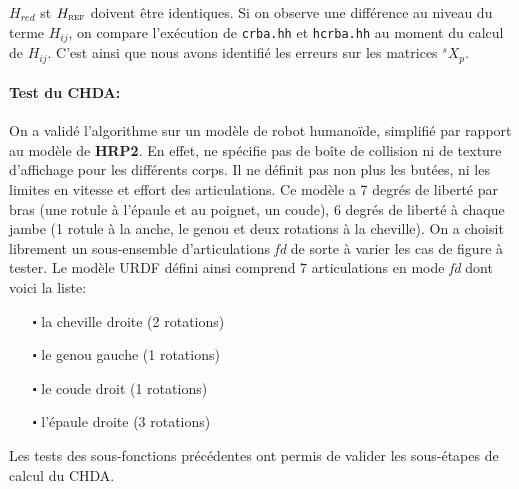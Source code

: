 \documentclass{report}
\begin{document}
$H_{red}$ st $H_{\textsc{ref}}$ doivent être identiques. Si on observe une différence au niveau du terme $H_{ij}$, on compare l'exécution de \verb;crba.hh; et \verb;hcrba.hh; au moment du calcul de $H_{ij}$. C'est ainsi que nous avons identifié les erreurs sur les matrices $^sX_p$.

\paragraph{Test du CHDA:}

On a validé l'algorithme sur un modèle de robot humanoïde, simplifié par rapport au modèle de \textbf{HRP2}. En effet, ne spécifie pas de boîte de collision ni de texture d'affichage pour les différents corps. Il ne définit pas non plus les butées, ni les limites en vitesse et effort des articulations. Ce modèle a 7 degrés de liberté par bras (une rotule à l'épaule et au poignet, un coude), 6 degrés de liberté à chaque jambe (1 rotule à la anche, le genou et deux rotations à la cheville). On a choisit librement un sous-ensemble d'articulations \emph{fd} de sorte à varier les cas de figure à tester. Le modèle URDF défini ainsi comprend 7 articulations en mode \emph{fd} dont voici la liste:
\begin{itemize}
\item[$\centerdot$] la cheville droite (2 rotations)
\item[$\centerdot$] le genou gauche (1 rotations)
\item[$\centerdot$] le coude droit (1 rotations)
\item[$\centerdot$] l'épaule droite (3 rotations)
\end{itemize}

Les tests des sous-fonctions précédentes ont permis de valider les sous-étapes de calcul du CHDA.
\end{document}
